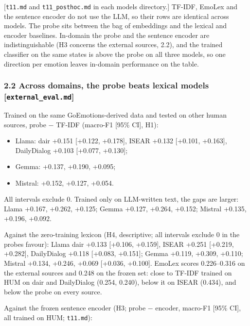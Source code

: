 \documentclass[
  10pt,
]{article}
\providecommand{\tightlist}{%
  \setlength{\itemsep}{0pt}\setlength{\parskip}{0pt}}
\begin{document}
{[}\texttt{t11.md} and \texttt{t11\_posthoc.md} in each
model\textquotesingle s directory.{]} TF-IDF, EmoLex and the sentence
encoder do not use the LLM, so their rows are identical across models.
The probe sits between the bag of embeddings and the lexical and encoder
baselines. In-domain the probe and the sentence encoder are
indistinguishable (H3 concerns the external sources, 2.2), and the
trained classifier on the same states is above the probe on all three
models, so one direction per emotion leaves in-domain performance on the
table.

\subsubsection{\texorpdfstring{2.2 Across domains, the probe beats
lexical models
{[}\texttt{external\_eval.md}{]}}{2.2 Across domains, the probe beats lexical models {[}external\_eval.md{]}}}\label{22-across-domains-the-probe-beats-lexical-models-external_evalmd}

Trained on the same GoEmotions-derived data and tested on other human
sources, probe − TF-IDF (macro-F1 {[}95\% CI{]}, H1):

\begin{itemize}
\tightlist
\item
  Llama: dair +0.151 {[}+0.122, +0.178{]}, ISEAR +0.132 {[}+0.101,
  +0.163{]}, DailyDialog +0.103 {[}+0.077, +0.130{]};
\item
  Gemma: +0.137, +0.190, +0.095;
\item
  Mistral: +0.152, +0.127, +0.054.
\end{itemize}

All intervals exclude 0. Trained only on LLM-written text, the gaps are
larger: Llama +0.167, +0.262, +0.125; Gemma +0.127, +0.264, +0.152;
Mistral +0.135, +0.196, +0.092.

Against the zero-training lexicon (H4, descriptive; all intervals
exclude 0 in the probe\textquotesingle s favour): Llama dair +0.133
{[}+0.106, +0.159{]}, ISEAR +0.251 {[}+0.219, +0.282{]}, DailyDialog
+0.118 {[}+0.083, +0.151{]}; Gemma +0.119, +0.309, +0.110; Mistral
+0.134, +0.246, +0.069 {[}+0.036, +0.100{]}. EmoLex scores 0.226--0.316
on the external sources and 0.248 on the frozen set: close to TF-IDF
trained on HUM on dair and DailyDialog (0.254, 0.240), below it on ISEAR
(0.434), and below the probe on every source.

Against the frozen sentence encoder (H3; probe − encoder, macro-F1
{[}95\% CI{]}, all trained on HUM; \texttt{t11.md}):
\end{document}
